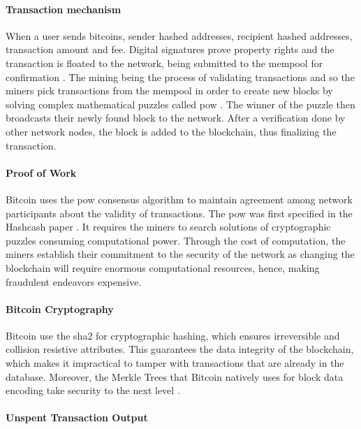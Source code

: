 \paragraph{Transaction mechanism}

When a user sends bitcoins, sender hashed addresses, recipient hashed addresses, transaction amount and fee. Digital signatures prove property rights and the transaction 
is floated to the network, being submitted to the mempool for confirmation \cite{bitcoincom}. The mining being the process of validating transactions and so the miners pick transactions 
from the \gls{mempool} in order to create new blocks by solving complex mathematical puzzles called \gls{pow} \cite{9129332}. The winner of the puzzle then 
broadcasts their newly found block to the network. After a verification done by other network nodes, the block is added to the blockchain, thus finalizing the transaction.

\paragraph{Proof of Work}

Bitcoin uses the \gls{pow} consensus algorithm to maintain agreement among network participants about the validity of transactions. The \gls{pow} was first 
specified in the Hashcash paper \cite{9129332}. It requires the miners to search solutions of cryptographic puzzles consuming computational power. Through the cost of computation, the miners
establish their commitment to the security of the network as changing the blockchain will require enormous computational resources, hence, making fraudulent endeavors expensive.

\paragraph{Bitcoin Cryptography}

Bitcoin use the \gls{sha2} for cryptographic hashing, which ensures irreversible and collision resistive attributes. This guarantees the data integrity of the 
blockchain, which makes it impractical to tamper with transactions that are already in the database. Moreover, the Merkle Trees that Bitcoin natively uses for block data 
encoding take security to the next level \cite{9129332}.

\paragraph{Unspent Transaction Output} 

